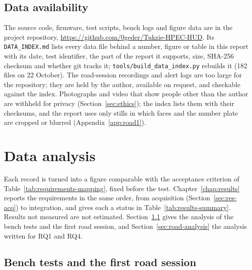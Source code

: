 \subsection{Data availability}
\label{sec:data-availability}

The source code, firmware, test scripts, bench logs and figure data are in the project repository, \url{https://github.com/0geder/Tukzie-HPEC-HUD}. Its \texttt{DATA\_INDEX.md} lists every data file behind a number, figure or table in this report with its date, test identifier, the part of the report it supports, size, SHA-256 checksum and whether git tracks it; \texttt{tools/\allowbreak{}build\_\allowbreak{}data\_\allowbreak{}index.py} rebuilds it (182 files on 22 October). The road-session recordings and alert logs are too large for the repository; they are held by the author, available on request, and checkable against the index. Photographs and video that show people other than the author are withheld for privacy (Section~\ref{sec:ethics}); the index lists them with their checksums, and the report uses only stills in which faces and the number plate are cropped or blurred (Appendix~\ref{app:road1}).

\section{Data analysis}
\label{sec:data-analysis}

Each record is turned into a figure comparable with the acceptance criterion of Table~\ref{tab:requirements-mapping}, fixed before the test. Chapter~\ref{chap:results} reports the requirements in the same order, from acquisition (Section~\ref{sec:res-acq}) to integration, and gives each a status in Table~\ref{tab:results-summary}. Results not measured are not estimated. Section~\ref{sec:bench-analysis} gives the analysis of the bench tests and the first road session, and Section~\ref{sec:road-analysis} the analysis written for RQ1 and RQ4.

\subsection{Bench tests and the first road session}
\label{sec:bench-analysis}


